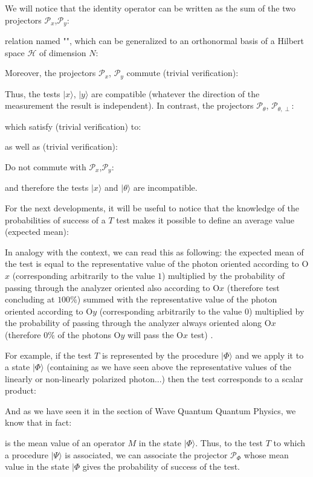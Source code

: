 	We will notice that the identity operator can be written as the sum of the two projectors $\mathcal{P}_x$,$\mathcal{P}_y$:
	
	relation named "", which can be generalized to an orthonormal basis of a Hilbert space $\mathcal{H}$ of dimension $N$:
	
	Moreover, the projectors $\mathcal{P}_x$,  $\mathcal{P}_y$ commute (trivial verification):
	
	Thus, the tests $|x\rangle$, $|y\rangle$ are compatible (whatever the direction of the measurement the result is independent). In contrast, the projectors $\mathcal{P}_\theta$, $\mathcal{P}_{\theta,\perp}$:
	
	which satisfy (trivial verification) to:
	
	as well as (trivial verification):
	
	Do not commute with $\mathcal{P}_x$,$\mathcal{P}_y$:
	
	and therefore the tests $|x\rangle$ and $|\theta\rangle$ are incompatible.

	For the next developments, it will be useful to notice that the knowledge of the probabilities of success of a $T$ test makes it possible to define an average value (expected mean):
	
	In analogy with the context, we can read this as following: the expected mean of the test is equal to the representative value of the photon oriented according to O$x$ (corresponding arbitrarily  to the value $1$) multiplied by the probability of passing through the analyzer oriented also according to O$x$ (therefore test concluding at $100\%$) summed with the representative value of the photon oriented according to O$y$ (corresponding arbitrarily to the value $0$) multiplied by the probability of passing through the analyzer always oriented along O$x$ (therefore $0\%$ of the photons O$y$ will pass the O$x$ test) .

	For example, if the test $T$ is represented by the procedure $|\Phi\rangle$ and we apply it to a state $|\Phi\rangle$ (containing as we have seen above the  representative values of the linearly or non-linearly polarized photon...) then the test corresponds to a scalar product:
	
	
	And as we have seen it in the section of Wave Quantum Quantum Physics, we know that in fact:
	
	is the mean value of an operator $M$ in the state $|\Phi\rangle$. Thus, to the test $T$ to which a procedure $|\Psi\rangle$ is associated, we can associate the projector $\mathcal{P}_{\Phi}$ whose mean value in the state $|\Phi$ gives the probability of success of the test.

